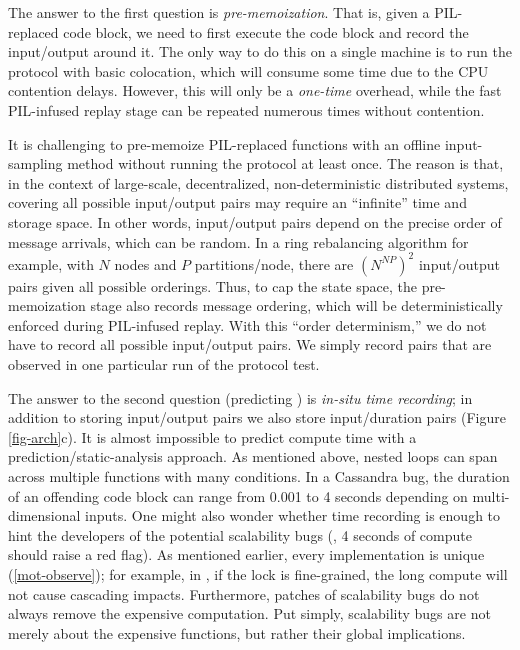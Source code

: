 The answer to the first question is {\em pre-memoization}.  That is, given
a PIL-replaced code block, we need to first execute the code block and
record the input/output around it.
%
The only way to do this on a single machine is to run the protocol with
basic colocation, which will consume some time due to the CPU contention
delays.
%
However, this will only be a {\em one-time} overhead, while the fast
PIL-infused replay stage can be repeated numerous times without
contention.



It is challenging to pre-memoize PIL-replaced functions with an offline
input-sampling method without running the protocol at least once.
%
The reason is that, in the context of large-scale, decentralized,
non-deterministic distributed systems, covering all possible input/output
pairs may require an ``infinite'' time and storage space.
%
In other words, input/output pairs depend on the precise order of message
arrivals, which can be random.
%
In a ring rebalancing algorithm for example, with $N$ nodes and $P$
partitions/node, there are $(N^{NP})^2$ input/output pairs given all
possible orderings.
%
Thus, to cap the state space, the pre-memoization stage also records
message ordering, which will be deterministically enforced during
PIL-infused replay.  With this ``order determinism,'' we do not have to
record all possible input/output pairs.  We simply record pairs that are
observed in one particular run of the protocol test.


The answer to the second question (predicting ) is {\em in-situ time
  recording}; in addition to storing input/output pairs we also store
input/duration pairs (Figure \ref{fig-arch}c).
%
It is almost impossible to predict compute time with a
prediction/static-analysis approach.
%
As mentioned above, nested loops can span across multiple functions with
many  conditions.  In a Cassandra bug, the duration of an
offending code block can range from 0.001 to 4 seconds depending on 
multi-dimensional inputs.
%
One might also wonder whether time recording is enough to hint the
developers of the potential scalability bugs (\eg, 4 seconds of compute
should raise a red flag).
%
As mentioned earlier, every implementation is unique (\sec\ref{mot-observe});
for example, in , if the lock is fine-grained, the long compute
will not cause cascading impacts.
%
Furthermore, patches of scalability bugs do not always remove the
expensive computation.
%
Put simply, scalability bugs are not merely about the expensive functions,
but rather their global implications.





